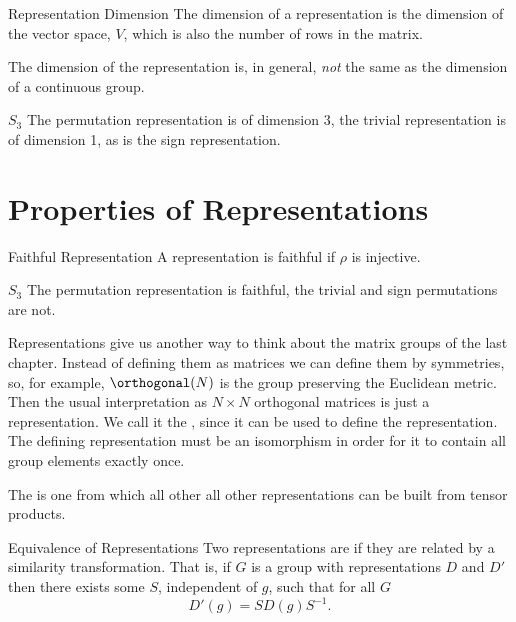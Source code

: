 \documentclass[fleqn]{NotesClass}
\newcommand{\symmetricGroup}[1][n]{S_{#1}}
\begin{document}
    \begin{dfn}{Representation Dimension}{}
        The dimension of a representation is the dimension of the vector space, \(V\), which is also the number of rows in the matrix.
    \end{dfn}
    
    \begin{wrn}
        The dimension of the representation is, in general, \emph{not} the same as the dimension of a continuous group.
    \end{wrn}
    
    \begin{exm}{\(\symmetricGroup[3]\)}{}
        The permutation representation is of dimension 3, the trivial representation is of dimension 1, as is the sign representation.
    \end{exm}
    
    \section{Properties of Representations}
    \begin{exm}{Faithful Representation}{}
        A representation is faithful if \(\rho\) is injective.
    \end{exm}
    
    \begin{exm}{\(\symmetricGroup[3]\)}{}
        The permutation representation is faithful, the trivial and sign permutations are not.
    \end{exm}
    
    Representations give us another way to think about the matrix groups of the last chapter.
    Instead of defining them as matrices we can define them by symmetries, so, for example, \(\orthogonal(N)\) is the group preserving the Euclidean metric.
    Then the usual interpretation as \(N \times N\) orthogonal matrices is just a representation.
    We call it the , since it can be used to define the representation.
    The defining representation must be an isomorphism in order for it to contain all group elements exactly once.
    
    The  is one from which all other all other representations can be built from tensor products.
    
    \begin{dfn}{Equivalence of Representations}{}
        Two representations are  if they are related by a similarity transformation.
        That is, if \(G\) is a group with representations \(D\) and \(D'\) then there exists some \(S\), independent of \(g\), such that for all \(G\)
        \begin{equation}
            D'(g) = SD(g)S^{-1}.
        \end{equation}
    \end{dfn}
    
\end{document}
